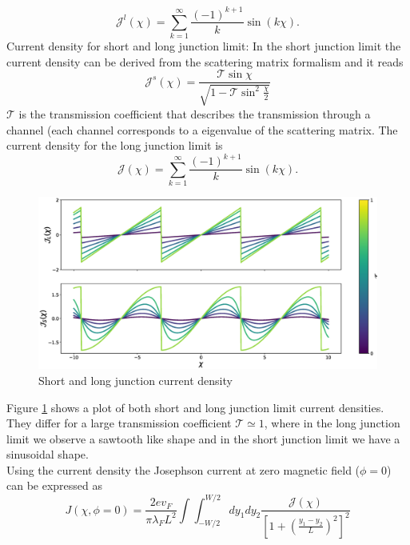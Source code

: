 \begin{equation}
\mathcal{J}^l(\chi) = \sum_{k = 1}^{\infty} \frac{(-1)^{k+1}}{k} \sin( k \chi).
\end{equation}
Current density for short and long junction limit: 
In the short junction limit the current density can be derived from the scattering matrix formalism and it reads
\begin{equation}
\mathcal{J}^s (\chi) = \frac{\mathcal{T} \sin \chi}{\sqrt{1 - \mathcal{T} \sin^2 \frac{\chi}{2}}}
\end{equation}
$\mathcal{T}$ is the transmission coefficient that describes the transmission through a channel (each channel corresponds to a eigenvalue of the scattering matrix.
The current density for the long junction limit is
\begin{equation}
\mathcal{J}(\chi) = \sum_{k = 1}^{\infty} \frac{(-1)^{k+1}}{k} \sin( k \chi).
\end{equation}
\begin{figure}
\centering
\includegraphics[width=\textwidth]{figure/analyticalmodel/current_density_all}
\caption{Short and long junction current density}
\label{fig:current_density}
\end{figure}
Figure \ref{fig:current_density} shows a plot of both short and long junction limit current densities. They differ for a large transmission coefficient $\mathcal{T} \simeq 1$, where in the long junction limit we observe a sawtooth like shape and in the short junction limit we have a sinusoidal shape.\\
Using the current density the Josephson current at zero magnetic field ($\phi = 0$) can be expressed as 
\begin{equation}
J\left(\chi, \phi=0\right) = \frac{2 e v_F}{\pi \lambda_F L^2}  \int \int_{-W/2}^{W/2} d y_1 d y_2 \frac{\mathcal{J}(\chi)}{\left[ 1 + \left(\frac{y_1 - y_2}{L}\right)^2\right]^2}
\label{eq:josephson_current_zero_b}
\end{equation}
